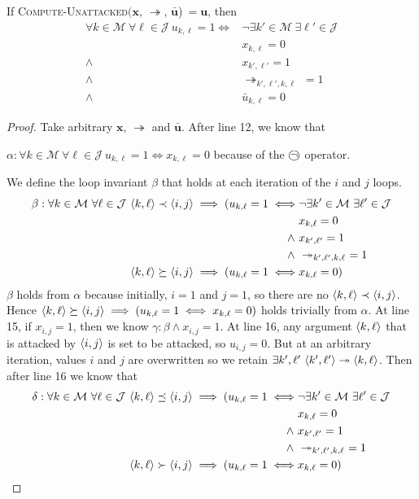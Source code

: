 \begin{lemma}
	\label{computeunattacked}
	
	If \textsc{Compute-Unattacked}$(\mathbf{x}$, $\twoheadrightarrow$, $\bar{\mathbf{u}}$)$\ =\mathbf{u}$, then
	\begin{align*}
		\forall k\in\mathcal{M}\ \forall\ell\in\mathcal{J}\ u_{k,\ell}=1\iff&\neg\exists k'\in\mathcal{M}\ \exists\ell'\in\mathcal{J}\\
		&x_{k,\ell}=0\\
		\land\ &x_{k',\ell'}=1\\
		\land\ &\twoheadrightarrow_{k',\ell',k,\ell}\ =1\\
		\land\ &\bar{u}_{k,\ell}=0
	\end{align*}
	
	\begin{proof}
		Take arbitrary $\mathbf{x}$, $\twoheadrightarrow$ and $\bar{\mathbf{u}}$. After line 12, we know that
		
		$\alpha: \forall k\in\mathcal{M}\ \forall\ell\in\mathcal{J}\ u_{k,\ell}=1\iff x_{k,\ell}=0$ because of the $\incircbin{\neg}$ operator.
		
		We define the loop invariant $\beta$ that holds at each iteration of the $i$ and $j$ loops. 
		\begin{align*}
			\beta: \forall k\in\mathcal{M}\ \forall\ell\in\mathcal{J}\ \pair{k}{\ell}\prec\pair{i}{j}\implies(u_{k,\ell}=1\iff&\neg\exists k'\in\mathcal{M}\ \exists\ell'\in\mathcal{J}\\
			&x_{k,\ell}=0\\
			\land\ &x_{k',\ell'}=1\\
			\land\ &\twoheadrightarrow_{k',\ell',k,\ell}\ =1\\
			\pair{k}{\ell}\succeq\pair{i}{j}\implies(u_{k,\ell}=1\iff&x_{k,\ell}=0)
		\end{align*}	
		$\beta$ holds from $\alpha$ because initially, $i=1$ and $j=1$, so there are no $\langle{k},{\ell}\rangle\prec\langle{i},{j}\rangle$. Hence $\langle{k},{\ell}\rangle\succeq\langle{i},{j}\rangle\implies(u_{k,\ell}=1\iff x_{k,\ell}=0)$ holds trivially from $\alpha$.
		\linespace
		At line 15, if $x_{i,j}=1$, then we know $\gamma: \beta\land x_{i,j}=1$. At line 16, any argument $\langle{k},{\ell}\rangle$ that is attacked by $\langle{i},{j}\rangle$ is set to be attacked, so $u_{i,j}=0$. But at an arbitrary iteration, values $i$ and $j$ are overwritten so we retain $\exists k',\ell'\ \langle{k'},{\ell'}\rangle\twoheadrightarrow\langle{k},{\ell}\rangle$. Then after line 16 we know that 
		\begin{align*}
			\delta: \forall k\in\mathcal{M}\ \forall\ell\in\mathcal{J}\ \pair{k}{\ell}\preceq\pair{i}{j}\implies(u_{k,\ell}=1\iff&\neg\exists k'\in\mathcal{M}\ \exists\ell'\in\mathcal{J}\\
			&x_{k,\ell}=0\\
			\land\ &x_{k',\ell'}=1\\
			\land\ &\twoheadrightarrow_{k',\ell',k,\ell}\ =1\\
			\pair{k}{\ell}\succ\pair{i}{j}\implies(u_{k,\ell}=1\iff&x_{k,\ell}=0)
		\end{align*}


\end{proof}
\end{lemma}
